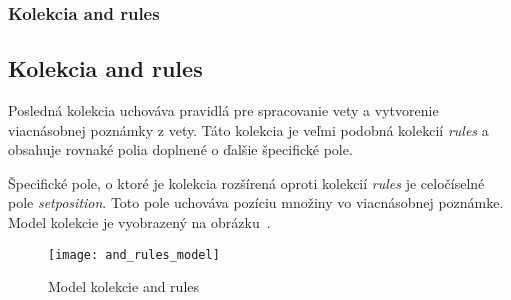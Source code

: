 %
%
{
	\subsubsection{Kolekcia and rules}
}
{
	\subsection{Kolekcia and rules}
}
\label{subsubsection:collection_and_rules}
Posledná kolekcia uchováva pravidlá pre spracovanie vety a vytvorenie viacnásobnej poznámky z vety. Táto kolekcia je veľmi podobná kolekcií \textit{rules} a obsahuje rovnaké polia doplnené o ďalšie špecifické pole.

Špecifické pole, o ktoré je kolekcia rozšírená oproti kolekcií \textit{rules} je celočíselné pole \textit{set\textunderscore position}. Toto pole uchováva pozíciu množiny vo viacnásobnej poznámke. Model kolekcie je vyobrazený na obrázku~.

\begin{figure}[H]
	\begin{center}\texttt{[image: and\_rules\_model]}\end{center}
	\caption[Model kolekcie and rules]{Model kolekcie and rules}\label{fig:and_rules_collection_model}
\end{figure}


